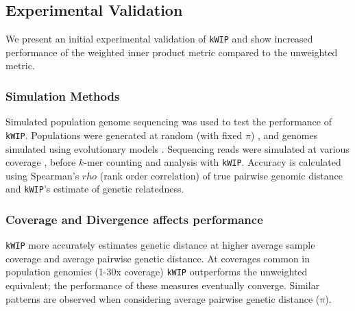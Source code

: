 \documentclass[a0,portrait]{a0poster}
\begin{document}
\begin{multicols}{2}

\section*{Experimental Validation}

We present an initial experimental validation of \texttt{kWIP} and show
increased performance of the weighted inner product metric compared to the
unweighted metric.

\subsubsection*{Simulation Methods}

Simulated population genome sequencing was used to test the performance of
\texttt{kWIP}. Populations were generated at random \autocite{staab_scrm:_2015}
(with fixed $\pi$) , and genomes simulated using evolutionary models
\autocite{cartwright_dna_2005}. Sequencing reads were simulated at various
coverage \autocite{holtgrewe_mason_2010}, before $k$-mer counting
\autocite{crusoe_khmer_2015} and analysis with \texttt{kWIP}.  Accuracy is
calculated using Spearman's $rho$ (rank order correlation) of true pairwise
genomic distance and \texttt{kWIP}'s estimate of genetic relatedness.

\subsubsection*{Coverage and Divergence affects performance}

\texttt{kWIP} more accurately estimates genetic distance at higher average
sample coverage and average pairwise genetic distance. At coverages common in
population genomics (1-30x coverage) \texttt{kWIP} outperforms the unweighted
equivalent; the performance of these measures eventually converge. Similar
patterns are observed when considering average pairwise genetic distance
($\pi$).


\end{multicols}
\end{document}
